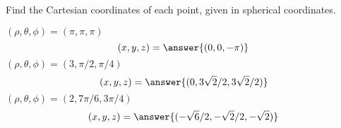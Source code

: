 \begin{problem}
Find the Cartesian coordinates of each point, given in spherical coordinates.

$(\rho,\theta,\phi) = (\pi,\pi,\pi)$
\[
(x,y,z) = \answer{(0, 0, -\pi)}
\]
$(\rho,\theta,\phi) = (3,\pi/2,\pi/4)$
\[
(x,y,z) = \answer{(0, 3\sqrt{2}/2, 3\sqrt{2}/2)}
\]
$(\rho,\theta,\phi) = (2,7\pi/6,3\pi/4)$
\[
(x,y,z) = \answer{(-\sqrt{6}/2, -\sqrt{2}/2, -\sqrt{2})}
\]

\end{problem}
